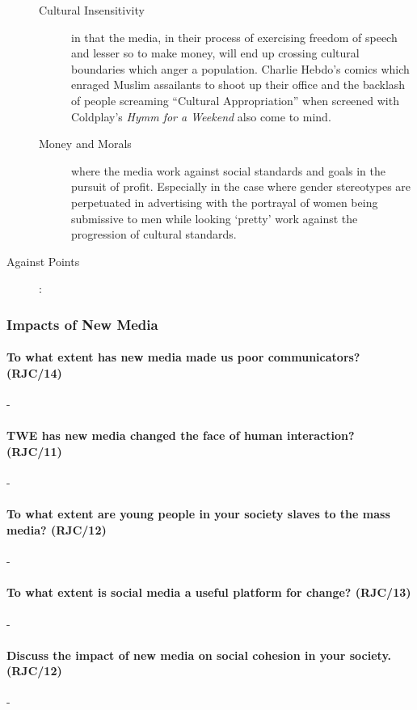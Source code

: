 \documentclass[../../main]{subfiles}
\begin{document}
\begin{description}
\begin{description}
			\item[Cultural Insensitivity] in that the media, in their process of exercising freedom of speech and lesser so to make money, will end up crossing cultural boundaries which anger a population. Charlie Hebdo's comics which enraged Muslim assailants to shoot up their office and the backlash of people screaming ``Cultural Appropriation'' when screened with Coldplay's \textit{Hymm for a Weekend} also come to mind.
			\item[Money and Morals] where the media work against social standards and goals in the pursuit of profit. Especially in the case where gender stereotypes are perpetuated in advertising with the portrayal of women being submissive to men while looking `pretty' work against the progression of cultural standards. 
		\end{description}
	\item[Against Points] :
		\begin{description}
			\item[]
		\end{description}
\end{description}

\subsubsection{Impacts of New Media}

\paragraph{To what extent has new media made us poor communicators? (RJC/14)}-

\paragraph{TWE has new media changed the face of human interaction? (RJC/11)}-

\paragraph{To what extent are young people in your society slaves to the mass media? (RJC/12)}-


\paragraph{To what extent is social media a useful platform for change? (RJC/13)}-

\paragraph{Discuss the impact of new media on social cohesion in your society. (RJC/12)}-
\end{document}
